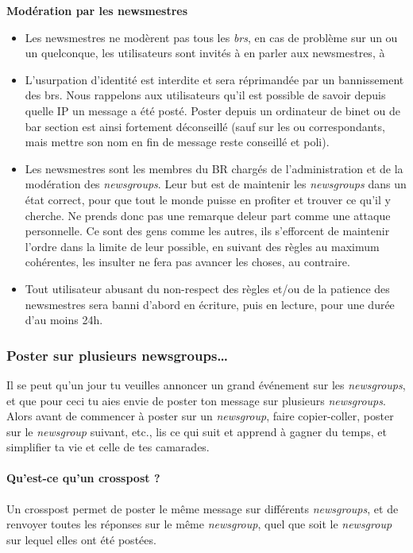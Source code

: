 \textbf{Modération par les newsmestres}
\begin{itemize}
 \item Les newsmestres ne modèrent pas tous les \emph{brs}, en cas de problème sur un  ou un  quelconque, les utilisateurs sont invités à en parler aux newsmestres, à 
 \item L'usurpation d'identité est interdite et sera réprimandée par un bannissement des brs. Nous rappelons aux utilisateurs qu'il est possible de savoir depuis quelle IP un message a été posté. Poster depuis un ordinateur de binet ou de bar section est ainsi fortement déconseillé (sauf sur les  ou  correspondants, mais mettre son nom en fin de message reste conseillé et poli).
 \item Les newsmestres sont les membres du BR chargés de l'administration et de la modération des \emph{newsgroups}. Leur but est de maintenir les \emph{newsgroups} dans un état correct, pour que tout le monde puisse en profiter et trouver ce qu'il y cherche. Ne prends donc pas une remarque deleur part comme une attaque personnelle. Ce sont des gens comme les autres, ils s'efforcent de maintenir l'ordre dans la limite de leur possible, en suivant des règles au maximum cohérentes, les insulter ne fera pas avancer les choses, au contraire.
 \item Tout utilisateur abusant du non-respect des règles et/ou de la patience des newsmestres sera banni d'abord en écriture, puis en lecture, pour une durée d'au moins 24h.
\end{itemize}


\subsubsection{Poster sur plusieurs newsgroups\dots }



Il se peut qu'un jour tu veuilles annoncer un grand événement sur les \emph{newsgroups}, et que pour ceci tu aies envie de poster ton message sur
plusieurs \emph{newsgroups}. Alors avant de commencer à poster sur un \emph{newsgroup}, faire copier-coller, poster sur le \emph{newsgroup} suivant,
etc., lis ce qui suit et apprend à gagner du temps, et simplifier ta vie et celle de tes camarades.

\paragraph{Qu'est-ce qu'un crosspost ?}
Un crosspost permet de poster le même message sur différents \emph{newsgroups}, et de renvoyer toutes les réponses sur le même \emph{newsgroup}, quel
que soit le \emph{newsgroup} sur lequel elles ont été postées.

